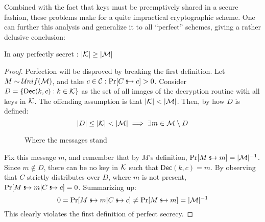 
Combined with the fact that keys must be preemptively shared in a secure fashion, these problems make for a quite impractical cryptographic scheme. One can further this analysis and generalize it to all ``perfect'' schemes, giving a rather delusive conclusion:

\begin{theorem}
    In any perfectly secret \ske{}: $|\mathcal{K}| \geq |\mathcal{M}|$
\end{theorem}
\begin{proof}
    Perfection will be disproved by breaking the first definition. Let $M \sim \mathcal{U}nif(\mathcal{M})$, and take $c \in \C : \Pr[C \evaluatesto c] > 0$. Consider $D = \{\textsf{Dec}(k, c) : k \in \mathcal{K}\}$ as the set of all images of the decryption routine with all keys in $\mathcal{K}$. The offending assumption is that $|\mathcal{K}| < |\mathcal{M}|$. Then, by how $D$ is defined:
    \[
        |D| \leq |\mathcal{K}| < |\mathcal{M}| \implies \exists m \in \mathcal{M} \setminus D
    \]

    \begin{figure}[h]
        \centering
        \def\firstcircle{(0,0) circle (1.5cm)}
        \def\secondcircle{(60:0) circle (0.9cm)}
        \caption{Where the messages stand}
    \end{figure}

    Fix this message $m$, and remember that by $M$'s definition, $\Pr[M \evaluatesto m] = |\M|^{-1}$. Since $m \notin D$, there can be no key in $\mathcal{K}$ such that $\textsf{Dec}(k, c) = m$. By observing that $C$ strictly distributes over $D$, where $m$ is not present, $\Pr[M \evaluatesto m|C \evaluatesto c] = 0$. Summarizing up:
    \[
        0 = \Pr[M \evaluatesto m|C \evaluatesto c] \neq \Pr[M \evaluatesto m] = |\M|^{-1}
    \]
    This clearly violates the first definition of perfect secrecy.
\end{proof}
